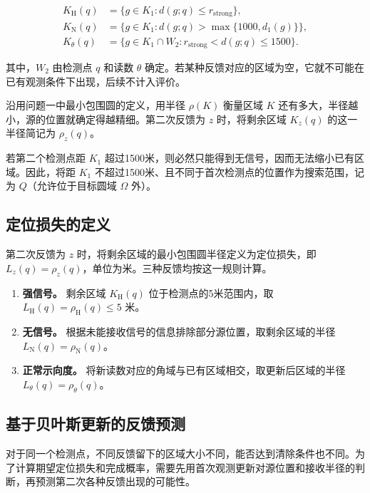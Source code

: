 \documentclass[UTF8,a4paper,zihao=-4,fontset=none]{ctexart}
\begin{document}
\begin{equation}
\begin{aligned}
K_{\mathrm H}(q)&=\{g\in K_1:d(g;q)\le r_{\mathrm{strong}}\},\\
K_{\mathrm N}(q)&=\{g\in K_1:d(g;q)>\max\{1000,d_1(g)\}\},\\
K_\theta(q)&=\{g\in K_1\cap W_2:r_{\mathrm{strong}}<d(g;q)\le1500\}.
\end{aligned}
\label{eq:q2-pair-regions}
\end{equation}

其中，\(W_2\) 由检测点 \(q\) 和读数 \(\theta\) 确定。若某种反馈对应的区域为空，它就不可能在已有观测条件下出现，后续不计入评价。

沿用问题一中最小包围圆的定义，用半径 \(\rho(K)\) 衡量区域 \(K\) 还有多大，半径越小，源的位置就确定得越精细。第二次反馈为 \(z\) 时，将剩余区域 \(K_z(q)\) 的这一半径简记为 \(\rho_z(q)\)。

若第二个检测点距 \(K_1\) 超过1500米，则必然只能得到无信号，因而无法缩小已有区域。因此，将距 \(K_1\) 不超过1500米、且不同于首次检测点的位置作为搜索范围，记为 \(Q\)（允许位于目标圆域 \(\Omega\) 外）。

\subsection{定位损失的定义}

第二次反馈为 \(z\) 时，将剩余区域的最小包围圆半径定义为定位损失，即 \(L_z(q)=\rho_z(q)\)，单位为米。三种反馈均按这一规则计算。

\begin{enumerate}[label=(\arabic*),leftmargin=2.2em]
  \item \textbf{强信号。} 剩余区域 \(K_{\mathrm H}(q)\) 位于检测点的5米范围内，取 \(L_{\mathrm H}(q)=\rho_{\mathrm H}(q)\le5\) 米。
  \item \textbf{无信号。} 根据未能接收信号的信息排除部分源位置，取剩余区域的半径 \(L_{\mathrm N}(q)=\rho_{\mathrm N}(q)\)。
  \item \textbf{正常示向度。} 将新读数对应的角域与已有区域相交，取更新后区域的半径 \(L_\theta(q)=\rho_\theta(q)\)。
\end{enumerate}

\subsection{基于贝叶斯更新的反馈预测}

对于同一个检测点，不同反馈留下的区域大小不同，能否达到清除条件也不同。为了计算期望定位损失和完成概率，需要先用首次观测更新对源位置和接收半径的判断，再预测第二次各种反馈出现的可能性。
\end{document}
